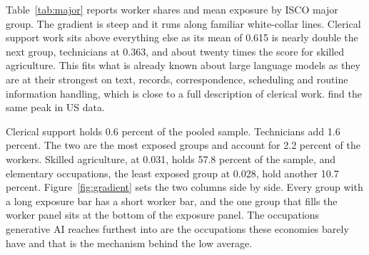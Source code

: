 Table~\ref{tab:major} reports worker shares and mean exposure by ISCO major
group. The gradient is steep and it runs along familiar white-collar lines. 
Clerical support work sits above everything else as its mean
of 0.615 is nearly double the next group, technicians at 0.363, and about twenty
times the score for skilled agriculture. This fits what is already known about
large language models as they are at their strongest on text, records,
correspondence, scheduling and routine information handling, which is close to a
full description of clerical work. \citet{eloundou2024} find the same peak in US
data.

Clerical support
holds 0.6 percent of the pooled sample. Technicians add 1.6 percent. 
The two are the most exposed groups and account for 2.2 percent of the workers. 
Skilled agriculture, at 0.031, holds 57.8 percent of the sample, and elementary
occupations, the least exposed group at 0.028, hold another 10.7 percent.
Figure~\ref{fig:gradient} sets the two columns side by side. 
Every group with a long exposure bar has a short worker bar,
and the one group that fills the worker panel sits at the bottom of the
exposure panel. The occupations generative AI reaches furthest into are the
occupations these economies barely have and that is the mechanism behind the low
average.

